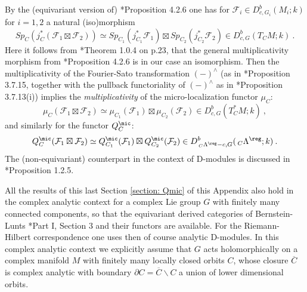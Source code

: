 \documentclass[11pt,letterpaper]{amsart}
\numberwithin{equation}{section}
\begin{document}
By the (equivariant version of) \cite{KaS94}*{Proposition 4.2.6} one has  for $\mathcal{F}_i\in D^b_{c,G_i}(M_i;k)$ for $i=1,2$
a natural (iso)morphism
$$Sp_{C}( j_C^*(\mathcal{F}_1\boxtimes \mathcal{F}_2))
  \simeq Sp_{C_1}( j_{C_1}^* \mathcal{F}_1) \boxtimes
  Sp_{C_2}( j_{C_2}^* \mathcal{F}_2) \in  D^b_{c,G}(T_CM;k) \:.$$
Here it follows from
\cite{Sch03}*{Theorem 1.0.4 on p.23},
that the general multiplicativity morphism from  \cite{KaS94}*{Proposition 4.2.6} is in our case an isomorphism.
Then the multiplicativity of the Fourier-Sato transformation $(-)^{\wedge}$ (as in \cite{KaS94}*{Proposition 3.7.15},
together with the pullback functoriality of $(-)^{\wedge}$ as in \cite{KaS94}*{Proposition 3.7.13(i)}) implies
the {\it multiplicativity} of the micro-localization functor $\mu_C$:
\begin{equation} \label{micro-multiplicativity}
  \mu_{C}(\mathcal{F}_1\boxtimes \mathcal{F}_2)
  \simeq \mu_{C_1}(\mathcal{F}_1) \boxtimes
  \mu_{C_2}(\mathcal{F}_2) \in  D^b_{c,G}(T^*_CM;k) \:,
\end{equation}
and similarly for the functor  $Q^\mic_C$:
\begin{equation} \label{micro-multiplicativity2}
  Q^\mic_{C}(\mathcal{F}_1\boxtimes \mathcal{F}_2)
  \simeq Q^\mic_{C_1}(\mathcal{F}_1) \boxtimes
  Q^\mic_{C_2}(\mathcal{F}_2) \in  D^b_{\,_C\Lambda^\reg-c,G}(\,_C\Lambda^\reg;k) \:.
\end{equation}
The (non-equivariant) counterpart in the context of D-modules is discussed in \cite{MF96}*{Proposition 1.2.5}.

\begin{remark}
All the results of this last Section \ref{section: Qmic} of this Appendix also hold in the complex analytic context for a complex Lie group $G$ with finitely many connected components,
so that the equivariant derived categories of 
Bernstein-Lunts \cite{BL94}*{Part I, Section 3}
and their functors are available. 
For the Riemann-Hilbert correspondence one uses then of course analytic D-modules.
In this complex analytic context we explicitly assume that $G$ acts holomorphically on a complex manifold $M$ with finitely many locally closed orbits $C$, whose closure $\overline{C}$ is complex analytic with boundary
$\partial{C}= \overline{C}\backslash C$ a union of lower dimensional orbits.
\end{remark}





\pagestyle{referencesstyle}
\thispagestyle{referencesstyle}


\end{document}

